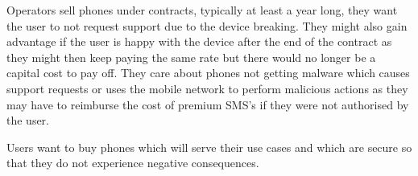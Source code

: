 Operators sell phones under contracts, typically at least a year long, they want the user to not request support due to the device breaking.
They might also gain advantage if the user is happy with the device after the end of the contract as they might then keep paying the same rate but there would no longer be a capital cost to pay off.
They care about phones not getting malware which causes support requests or uses the mobile network to perform malicious actions as they may have to reimburse the cost of premium SMS's if they were not authorised by the user.

Users want to buy phones which will serve their use cases and which are secure so that they do not experience negative consequences.

